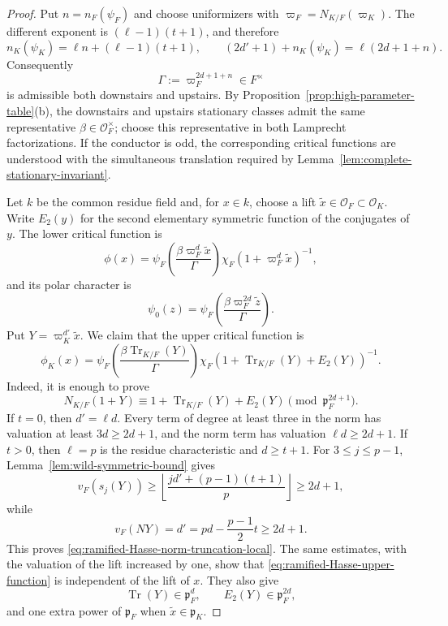 \documentclass[11pt]{amsart}
\theoremstyle{definition}
\theoremstyle{remark}
\newcommand{\cO}{\mathcal O}
\newcommand{\p}{\mathfrak p}
\newcommand{\Tr}{\operatorname{Tr}}
\begin{document}
\begin{proof}
Put $n=n_F(\psi_F)$ and choose uniformizers with
$\varpi_F=N_{K/F}(\varpi_K)$.  The different exponent is
$(\ell-1)(t+1)$, and therefore
\[
 n_K(\psi_K)=\ell n+(\ell-1)(t+1),
 \qquad
 (2d'+1)+n_K(\psi_K)=\ell(2d+1+n).
\]
Consequently
\[
 \Gamma:=\varpi_F^{2d+1+n}\in F^\times
\]
is admissible both downstairs and upstairs.  By
Proposition~\ref{prop:high-parameter-table}(b), the downstairs and
upstairs stationary classes admit the same representative
$\beta\in\cO_F^\times$; choose this representative in both Lamprecht
factorizations.  If the conductor is odd, the corresponding critical
functions are understood with the simultaneous translation required by
Lemma~\ref{lem:complete-stationary-invariant}.

Let $k$ be the common residue field and, for $x\in k$, choose a
lift $\widetilde x\in\cO_F\subset\cO_K$.  Write $E_2(y)$ for the second
elementary symmetric function of the conjugates of $y$.  The lower
critical function is
\begin{equation}\label{eq:ramified-Hasse-lower-function}
 \phi(x)=
 \psi_F\!\left(\frac{\beta\varpi_F^d\widetilde x}{\Gamma}\right)
 \chi_F(1+\varpi_F^d\widetilde x)^{-1},
\end{equation}
and its polar character is
\[
 \psi_0(z)=
 \psi_F\!\left(\frac{\beta\varpi_F^{2d}\widetilde z}{\Gamma}\right).
\]
Put $Y=\varpi_K^{d'}\widetilde x$.  We claim that the upper critical
function is
\begin{equation}\label{eq:ramified-Hasse-upper-function}
 \phi_K(x)=
 \psi_F\!\left(\frac{\beta\Tr_{K/F}(Y)}{\Gamma}\right)
 \chi_F\!\left(1+\Tr_{K/F}(Y)+E_2(Y)\right)^{-1}.
\end{equation}
Indeed, it is enough to prove
\begin{equation}\label{eq:ramified-Hasse-norm-truncation-local}
 N_{K/F}(1+Y)
 \equiv1+\Tr_{K/F}(Y)+E_2(Y)
       \pmod{\p_F^{2d+1}}.
\end{equation}
If $t=0$, then $d'=\ell d$.  Every term of degree at least three in
the norm has valuation at least $3d\ge2d+1$, and the norm term has
valuation $\ell d\ge2d+1$.  If $t>0$, then $\ell=p$ is the residue
characteristic and $d\ge t+1$.  For $3\le j\le p-1$,
Lemma~\ref{lem:wild-symmetric-bound} gives
\[
 v_F(s_j(Y))\ge
 \left\lfloor\frac{j d'+(p-1)(t+1)}p\right\rfloor
 \ge2d+1,
\]
while
\[
 v_F(NY)=d'=pd-\frac{p-1}{2}t\ge2d+1.
\]
This proves \eqref{eq:ramified-Hasse-norm-truncation-local}.  The same
estimates, with the valuation of the lift increased by one, show that
\eqref{eq:ramified-Hasse-upper-function} is independent of the lift of
$x$.  They also give
\[
 \Tr(Y)\in\p_F^d,
 \qquad E_2(Y)\in\p_F^{2d},
\]
and one extra power of $\p_F$ when $\widetilde x\in\p_K$.


\end{proof}
\end{document}
